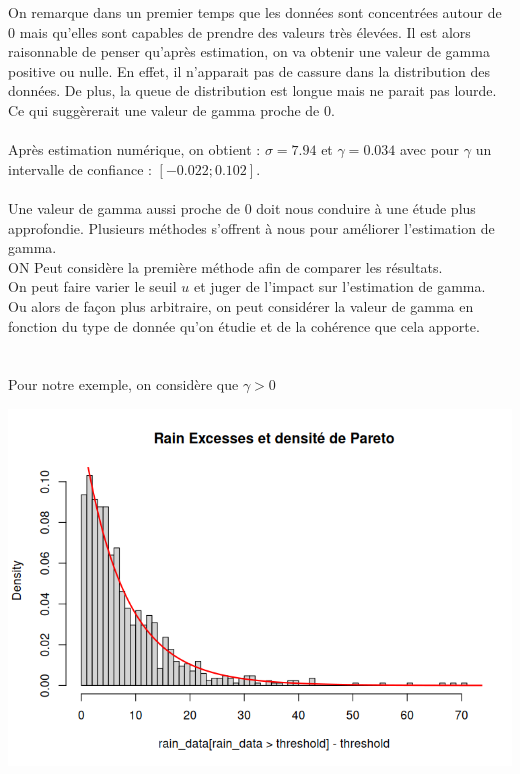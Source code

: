 \documentclass{article}
\begin{document}
On remarque dans un premier temps que les données sont concentrées autour de 0 mais qu'elles sont capables de prendre des valeurs très élevées.
Il est alors raisonnable de penser qu'après estimation, on va obtenir une valeur de gamma positive ou nulle. En effet, il n'apparait pas de cassure dans la distribution des données.
De plus, la queue de distribution est longue mais ne parait pas lourde. Ce qui suggèrerait une valeur de gamma proche de 0.
\\
\\
Après estimation numérique, on obtient : $\sigma = 7.94$ et $\gamma = 0.034$ avec pour $\gamma$ un intervalle de confiance : $[-0.022 ; 0.102]$.
\\
\\ 
Une valeur de gamma aussi proche de 0 doit nous conduire à une étude plus approfondie.
Plusieurs méthodes s'offrent à nous pour améliorer l'estimation de gamma. 
\\
ON Peut considère la première méthode afin de comparer les résultats.
\\
On peut faire varier le seuil $u$ et juger de l'impact sur l'estimation de gamma.
\\
Ou alors de façon plus arbitraire, on peut considérer la valeur de gamma en fonction du type de donnée qu'on étudie et de la cohérence que cela apporte.
\\
\\
\\
Pour notre exemple, on considère que $\gamma > 0$

\begin{center}
	\includegraphics[scale=0.8]{./images/rainhistodensite.png} 
\end{center}
\end{document}
